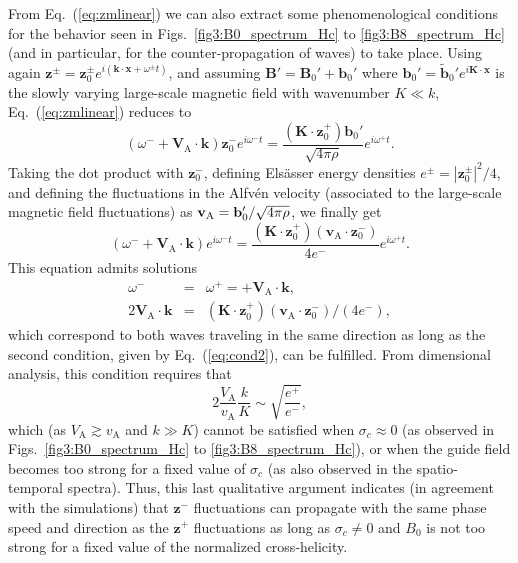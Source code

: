 \documentclass[aip,pop,reprint,amsmath,amssymb,floatfix]{revtex4-1}
\renewcommand{\vec}[1]{\mathbf{#1}}
\begin{document}
From Eq.~(\ref{eq:zmlinear}) we can also extract some phenomenological
conditions for the behavior seen in Figs.~\ref{fig3:B0_spectrum_Hc} to
\ref{fig3:B8_spectrum_Hc} (and in particular, for the
counter-propagation of waves) to take place. Using again $\vec{z}^\pm
= \vec{z}_0^\pm e^{i(\vec{k}\cdot \vec{x}+\omega^\pm t)}$, and
assuming $\vec{B}' = \vec{B}_0' + \vec{b}_0'$ where $\vec{b}_0' =
\vec{\tilde{b}}_0'e^{i\vec{K} \cdot \vec{x}}$ is the slowly varying
large-scale magnetic field with wavenumber $K \ll k$,
Eq.~(\ref{eq:zmlinear}) reduces to
\begin{equation}
\left( \omega^- +\vec{V}_\textrm{A} \cdot \vec{k} \right) 
    \vec{z}_0^- e^{i \omega^- t} = 
    \frac{\left(\vec{K} \cdot \vec{z}_0^+\right) \vec{b}_0'}{\sqrt{4\pi \rho}} 
    e^{i \omega^+ t} .
\end{equation}
Taking the dot product with $\vec{z}_0^-$, defining Els\"asser energy
densities $e^\pm = |\vec{z}_0^\pm|^2/4$, and defining the fluctuations
in the Alfv\'en velocity (associated to the large-scale magnetic field
fluctuations) as ${\bf v}_\textrm{A} = \vec{b}_0'/\sqrt{4\pi \rho}$,
we finally get
\begin{equation}
\left( \omega^- + \vec{V}_\textrm{A} \cdot \vec{k} \right)
    e^{i \omega^- t} = 
    \frac{\left(\vec{K} \cdot \vec{z}_0^+\right)
    \left(\vec{v}_\textrm{A} \cdot \vec{z}_0^-\right)}
    {4e^-} 
    e^{i \omega^+ t} .
\end{equation}
This equation admits solutions
\begin{eqnarray}
    \omega^- &=& \omega^+ =
    + \vec{V}_\textrm{A} \cdot \vec{k}, 
    \label{eq:cond1} \\
    2 \vec{V}_\textrm{A} \cdot \vec{k} &=& 
    \left(\vec{K} \cdot \vec{z}_0^+\right)
    \left(\vec{v}_\textrm{A} \cdot \vec{z}_0^-\right) /
    (4e^-), \label{eq:cond2}
\end{eqnarray}
which correspond to both waves traveling in the same direction as long
as the second condition, given by Eq.~(\ref{eq:cond2}), can be
fulfilled. From dimensional analysis, this condition requires that
\begin{equation}
    2 \frac{V_\textrm{A}}{v_\textrm{A}} \frac{k}{K}
    \sim \sqrt{\frac{e^+}{e^-}},
\end{equation}
which (as $V_\textrm{A}\gtrsim v_\textrm{A}$ and $k\gg K$) cannot be
satisfied when $\sigma_c \approx 0$ (as observed in
Figs.~\ref{fig3:B0_spectrum_Hc} to \ref{fig3:B8_spectrum_Hc}), or when
the guide field becomes too strong for a fixed value of $\sigma_c$ (as
also observed in the spatio-temporal spectra). Thus, this last
qualitative argument indicates (in agreement with the simulations)
that $\vec{z}^-$ fluctuations can propagate with the same phase speed
and direction as the $\vec{z}^+$ fluctuations as long as $\sigma_c
\neq 0$ and $B_0$ is not too strong for a fixed value of the
normalized cross-helicity.
\end{document}
